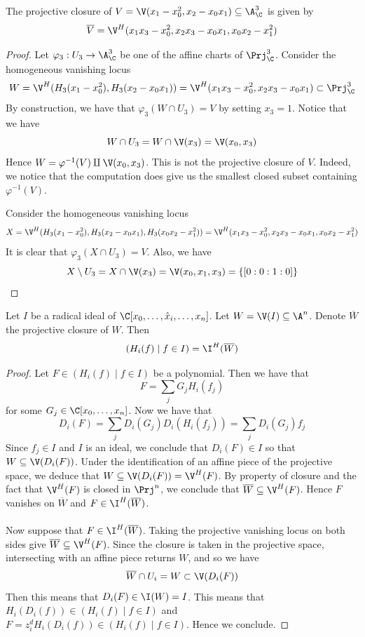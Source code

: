 \documentclass[a4paper]{article}
\begin{document}
\begin{eg}{}{} The projective closure of $V=\V(x_1-x_0^2,x_2-x_0x_1)\subseteq\A_\C^3$ is given by $$\overline{V}=\V^H(x_1x_3-x_0^2,x_2x_3-x_0x_1,x_0x_2-x_1^2)$$ 
\begin{proof}
Let $\varphi_3:U_3\to\A_\C^3$ be one of the affine charts of $\Prj_\C^3$. Consider the homogeneous vanishing locus $$W=\V^H(H_3(x_1-x_0^2),H_3(x_2-x_0x_1))=\V^H(x_1x_3-x_0^2, x_2x_3-x_0x_1)\subset\Prj_\C^3$$ By construction, we have that $\varphi_3(W\cap U_3)=V$ by setting $x_3=1$. Notice that we have $$W\cap U_3=W\cap\V(x_3)=\V(x_0,x_3)$$ Hence $W=\varphi^{-1}(V)\amalg\V(x_0,x_3)$. This is not the projective closure of $V$. Indeed, we notice that the computation does give us the smallest closed subset containing $\varphi^{-1}(V)$. 

Consider the homogeneous vanishing locus $$X=\V^H(H_3(x_1-x_0^2),H_3(x_2-x_0x_1),H_3(x_0x_2-x_1^2))=\V^H(x_1x_3-x_0^2,x_2x_3-x_0x_1,x_0x_2-x_1^2)$$ It is clear that $\varphi_3(X\cap U_3)=V$. Also, we have $$X\setminus U_3=X\cap\V(x_3)=\V(x_0,x_1,x_3)=\{[0:0:1:0]\}$$
\end{proof}
\end{eg}

\begin{prp}{}{} Let $I$ be a radical ideal of $\C[x_0,\dots,\hat{x}_i,\dots,x_n]$. Let $W=\V(I)\subseteq\A^n$. Denote $\overline{W}$ the projective closure of $W$. Then $$(H_i(f)\;|\;f\in I)=\I^H(\overline{W})$$ 
\begin{proof}
Let $F\in(H_i(f)\;|\;f\in I)$ be a polynomial. Then we have that $$F=\sum_j G_jH_i(f_j)$$ for some $G_j\in\C[x_0,\dots,x_n]$. Now we have that $$D_i(F)=\sum_jD_i(G_j)D_i(H_i(f_j))=\sum_jD_i(G_j)f_j$$ Since $f_j\in I$ and $I$ is an ideal, we conclude that $D_i(F)\in I$ so that $W\subseteq\V(D_i(F))$. Under the identification of an affine piece of the projective space, we deduce that $W\subseteq\V(D_i(F))=\V^H(F)$. By property of closure and the fact that $\V^H(F)$ is closed in $\Prj^n$, we conclude that $\overline{W}\subseteq\V^H(F)$. Hence $F$ vanishes on $\overline{W}$ and $F\in\I^H(\overline{W})$. \\~\\

Now suppose that $F\in\I^H(\overline{W})$. Taking the projective vanishing locus on both sides give $\overline{W}\subseteq\V^H(F)$. Since the closure is taken in the projective space, intersecting with an affine piece returns $W$, and so we have $$\overline{W}\cap U_i=W\subset\V(D_i(F))$$ Then this means that $D_i(F)\in\I(W)=I$. This means that $H_i(D_i(f))\in(H_i(f)\;|\;f\in I)$ and $F=z_i^dH_i(D_i(f))\in(H_i(f)\;|\;f\in I)$. Hence we conclude. 
\end{proof}
\end{prp}
\end{document}
